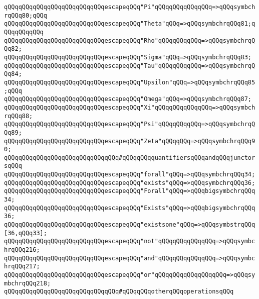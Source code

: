 \verb|qQQqqQQqqQQqqQQqqQQqqQQqqQQqescapeqQQq"Pi"qQQqqQQqqQQqqQQq=>qQQqsymbchrqQQq80;qQQq|\newline
\verb|qQQqqQQqqQQqqQQqqQQqqQQqqQQqescapeqQQq"Theta"qQQq=>qQQqsymbchrqQQq81;qQQqqQQqqQQq|\newline
\verb|qQQqqQQqqQQqqQQqqQQqqQQqqQQqescapeqQQq"Rho"qQQqqQQqqQQq=>qQQqsymbchrqQQq82;|\newline
\verb|qQQqqQQqqQQqqQQqqQQqqQQqqQQqescapeqQQq"Sigma"qQQq=>qQQqsymbchrqQQq83;|\newline
\verb|qQQqqQQqqQQqqQQqqQQqqQQqqQQqescapeqQQq"Tau"qQQqqQQqqQQq=>qQQqsymbchrqQQq84;|\newline
\verb|qQQqqQQqqQQqqQQqqQQqqQQqqQQqescapeqQQq"Upsilon"qQQq=>qQQqsymbchrqQQq85;qQQq|\newline
\verb|qQQqqQQqqQQqqQQqqQQqqQQqqQQqescapeqQQq"Omega"qQQq=>qQQqsymbchrqQQq87;|\newline
\verb|qQQqqQQqqQQqqQQqqQQqqQQqqQQqescapeqQQq"Xi"qQQqqQQqqQQqqQQq=>qQQqsymbchrqQQq88;|\newline
\verb|qQQqqQQqqQQqqQQqqQQqqQQqqQQqescapeqQQq"Psi"qQQqqQQqqQQq=>qQQqsymbchrqQQq89;|\newline
\verb|qQQqqQQqqQQqqQQqqQQqqQQqqQQqescapeqQQq"Zeta"qQQqqQQq=>qQQqsymbchrqQQq90;|\newline
\newline
\verb|qQQqqQQqqQQqqQQqqQQqqQQqqQQqqQQq#qQQqqQQqquantifiersqQQqandqQQqjunctorsqQQq|\newline
\verb|qQQqqQQqqQQqqQQqqQQqqQQqqQQqescapeqQQq"forall"qQQq=>qQQqsymbchrqQQq34;|\newline
\verb|qQQqqQQqqQQqqQQqqQQqqQQqqQQqescapeqQQq"exists"qQQq=>qQQqsymbchrqQQq36;|\newline
\verb|qQQqqQQqqQQqqQQqqQQqqQQqqQQqescapeqQQq"Forall"qQQq=>qQQqbigsymbchrqQQq34;|\newline
\verb|qQQqqQQqqQQqqQQqqQQqqQQqqQQqescapeqQQq"Exists"qQQq=>qQQqbigsymbchrqQQq36;|\newline
\verb|qQQqqQQqqQQqqQQqqQQqqQQqqQQqescapeqQQq"existsone"qQQq=>qQQqsymbstrqQQq[36,qQQq33];|\newline
\verb|qQQqqQQqqQQqqQQqqQQqqQQqqQQqescapeqQQq"not"qQQqqQQqqQQqqQQq=>qQQqsymbchrqQQq216;|\newline
\verb|qQQqqQQqqQQqqQQqqQQqqQQqqQQqescapeqQQq"and"qQQqqQQqqQQqqQQq=>qQQqsymbchrqQQq217;|\newline
\verb|qQQqqQQqqQQqqQQqqQQqqQQqqQQqescapeqQQq"or"qQQqqQQqqQQqqQQqqQQq=>qQQqsymbchrqQQq218;|\newline
\newline
\verb|qQQqqQQqqQQqqQQqqQQqqQQqqQQqqQQq#qQQqqQQqotherqQQqoperationsqQQq|\newline
